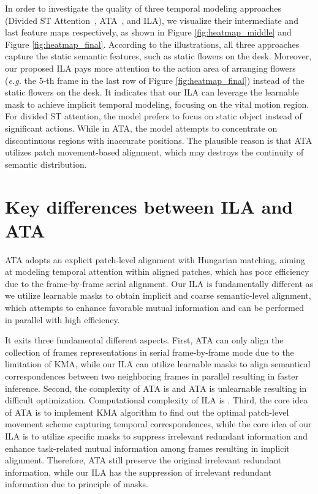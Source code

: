 \documentclass[10pt,twocolumn,letterpaper]{article}
\begin{document}
In order to investigate the quality of three temporal modeling approaches (Divided ST Attention~\cite{b13}, ATA~\cite{b28}, and ILA), we visualize their intermediate and last feature maps respectively, as shown in Figure \ref{fig:heatmap_middle} and Figure \ref{fig:heatmap_final}.
According to the illustrations, all three approaches capture the static semantic features, such as static flowers on the desk. 
Moreover, our proposed ILA pays more attention to the action area of arranging flowers (\emph{e.g.} the 5-th frame in the last row of Figure \ref{fig:heatmap_final}) instead of the static flowers on the desk. 
It indicates that our ILA can leverage the learnable mask to achieve implicit temporal modeling, focusing on the vital motion region.
For divided ST attention, the model prefers to focus on static object instead of significant actions. 
While in ATA, the model attempts to concentrate on discontinuous regions with inaccurate positions.
The plausible reason is that ATA utilizes patch movement-based alignment, which may destroys the continuity of semantic distribution. 

\section{Key differences between ILA and ATA} ATA adopts an explicit patch-level alignment with Hungarian matching, aiming at modeling temporal attention within aligned patches, which has poor efficiency due to the frame-by-frame serial alignment. Our ILA is fundamentally different as we utilize learnable masks to obtain implicit and coarse semantic-level alignment, which attempts to enhance favorable mutual information and can be performed in parallel with high efficiency. 

It exits three fundamental different aspects. First, ATA can only align the collection of frames representations in serial frame-by-frame mode due to the limitation of KMA, while our ILA can utilize learnable masks to align semantical correspondences between two neighboring frames in parallel resulting in faster inference. Second, the complexity of ATA is  and ATA is unlearnable resulting in difficult optimization. Computational complexity of ILA is . Third, the core idea of ATA is to implement KMA algorithm to find out the optimal patch-level movement scheme capturing temporal correspondences, while the core idea of our ILA is to utilize specific masks to suppress irrelevant redundant information and enhance task-related mutual information among frames resulting in implicit alignment. Therefore, ATA still preserve the original irrelevant redundant information, while our ILA has the suppression of irrelevant redundant information due to principle of masks.
\end{document}
